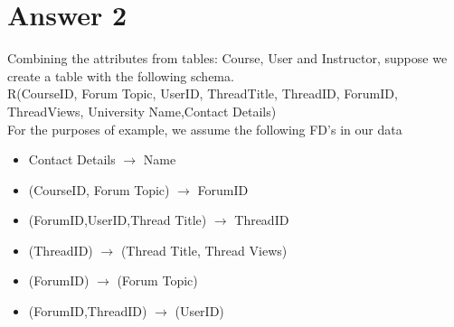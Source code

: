 \documentclass[10pt]{article}
\begin{document}
\section{Answer 2}
Combining the attributes from tables: Course, User and Instructor, suppose we create a table with the following schema.\\
R(CourseID, Forum Topic, UserID, ThreadTitle, ThreadID, ForumID, ThreadViews, University Name,Contact Details)\\
For the purposes of example, we assume the following FD's in our data

\begin{itemize}
\item Contact Details $\rightarrow$ Name
\item(CourseID, Forum Topic) $\rightarrow$ ForumID
\item (ForumID,UserID,Thread Title) $\rightarrow$ ThreadID
\item (ThreadID) $\rightarrow$ (Thread Title, Thread Views)
\item (ForumID) $\rightarrow$ (Forum Topic)
\item (ForumID,ThreadID) $\rightarrow$ (UserID)
\end{itemize}
\end{document}
